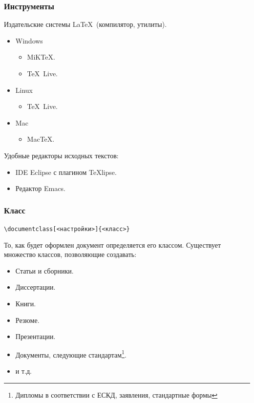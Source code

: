 \begin{frame}
\frametitle{Инструменты}
Издательские системы \LaTeX\ (компилятор, утилиты).
\begin{itemize}
    \item Windows
    \begin{itemize}
        \item MiK\TeX.
        \item \TeX\ Live.
    \end{itemize}
    \item Linux
    \begin{itemize}
        \item \TeX\ Live.
    \end{itemize}
    \item Mac
    \begin{itemize}
        \item Mac\TeX.
    \end{itemize}
\end{itemize}
Удобные редакторы исходных текстов: 
\begin{itemize}
    \item IDE Eclipse с плагином \TeX lipse.
    \item Редактор Emacs.
\end{itemize}
\end{frame}


\begin{frame}[fragile]
\frametitle{Класс}

\begin{center}
\verb"\documentclass[<настройки>]{<класс>}"
\end{center}

То, как будет \alert{оформлен} документ определяется его \alert{классом}. Существует множество классов, позволяющие создавать:
\begin{itemize}
    \item Статьи и сборники.
    \item Диссертации.
    \item Книги.
    \item Резюме.
    \item Презентации.
    \item Документы, следующие стандартам\footnote{Дипломы в соответствии с ЕСКД, заявления, стандартные формы}.
    \item и т.д.
\end{itemize}
\end{frame}


